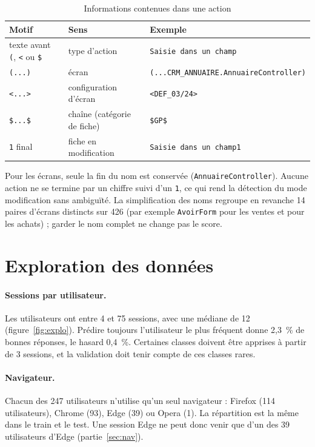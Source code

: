 \documentclass{rapportECL}
\newcommand{\tok}[1]{\texttt{\small #1}}
\begin{document}
\begin{table}[!htbp]
\centering\small
\begin{tabular}{lll}
\toprule
Motif & Sens & Exemple \\
\midrule
texte avant \tok{(}, \tok{<} ou \tok{\$} & type d'action & \tok{Saisie dans un champ} \\
\tok{(...)} & écran & \tok{(...CRM\_ANNUAIRE.AnnuaireController)} \\
\tok{<...>} & configuration d'écran & \tok{<DEF\_03/24>} \\
\tok{\$...\$} & chaîne (catégorie de fiche) & \tok{\$GP\$} \\
\tok{1} final & fiche en modification & \tok{Saisie dans un champ1} \\
\bottomrule
\end{tabular}
\caption{Informations contenues dans une action}
\label{tab:action}
\end{table}

Pour les écrans, seule la fin du nom est conservée (\tok{AnnuaireController}). Aucune action ne se termine par un chiffre suivi d'un \tok{1}, ce qui rend la détection du mode modification sans ambiguïté. La simplification des noms regroupe en revanche 14 paires d'écrans distincts sur 426 (par exemple \tok{AvoirForm} pour les ventes et pour les achats) ; garder le nom complet ne change pas le score.

\section{Exploration des données}

\paragraph{Sessions par utilisateur.} Les utilisateurs ont entre 4 et 75 sessions, avec une médiane de 12 (figure~\ref{fig:explo}). Prédire toujours l'utilisateur le plus fréquent donne 2,3~\% de bonnes réponses, le hasard 0,4~\%. Certaines classes doivent être apprises à partir de 3 sessions, et la validation doit tenir compte de ces classes rares.

\paragraph{Navigateur.} Chacun des 247 utilisateurs n'utilise qu'un seul navigateur : Firefox (114 utilisateurs), Chrome (93), Edge (39) ou Opera (1). La répartition est la même dans le train et le test. Une session Edge ne peut donc venir que d'un des 39 utilisateurs d'Edge (partie~\ref{sec:nav}).
\end{document}

